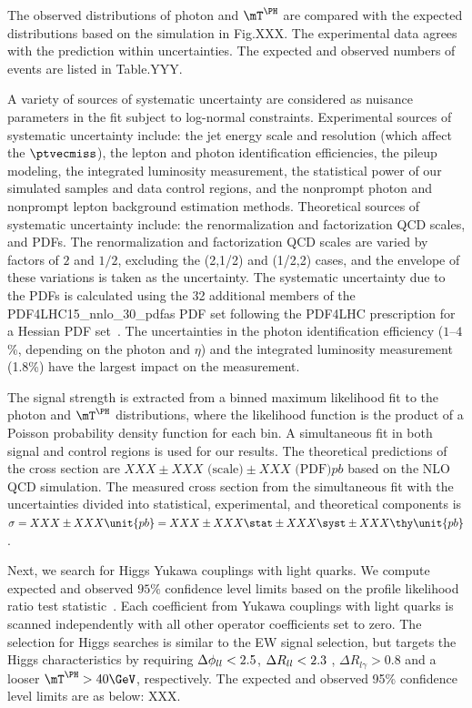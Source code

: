 The observed distributions of photon \pt and $\mTH$ are compared with the expected distributions based on the \MGvATNLO simulation in Fig.XXX. The experimental data agrees with the prediction within uncertainties. The expected and observed numbers of events are listed in Table.YYY.

A variety of sources of systematic uncertainty are considered as nuisance parameters in the fit subject to log-normal constraints. Experimental sources of systematic uncertainty include: the jet energy scale and resolution (which affect the $\ptvecmiss$), the lepton and photon identification efficiencies, the pileup modeling, the integrated luminosity measurement, the statistical power of our simulated samples and data control regions, and the nonprompt photon and nonprompt lepton background estimation methods. Theoretical sources of systematic uncertainty include: the renormalization and factorization QCD scales, and PDFs. The renormalization and factorization QCD scales are varied by factors of $2$ and $1/2$, excluding the (2,1/2) and (1/2,2) cases, and the envelope of these variations is taken as the uncertainty. The systematic uncertainty due to the PDFs is calculated using the 32 additional members of the PDF4LHC15\_nnlo\_30\_pdfas PDF set following the PDF4LHC prescription for a Hessian PDF set~\cite{Butterworth_2016,Harland_Lang_2015,Ball_2015,PhysRevD.93.033006}. The uncertainties in the photon identification efficiency ($1$--$4$\%, depending on the photon \pt and $\eta$) and the integrated luminosity measurement (1.8\%) have the largest impact on the measurement.

The signal strength is extracted from a binned maximum likelihood fit to the photon \pt and $\mTH$ distributions, where the likelihood function is the product of a Poisson probability density function for each bin. A simultaneous fit in both signal and control regions is used for our results. The theoretical predictions of the cross section are $XXX \pm XXX \text{ (scale)} \pm XXX \text{ (PDF)} \unit{pb}$ based on the NLO QCD \MGvATNLO simulation. The measured cross section from the simultaneous fit with the uncertainties divided into statistical, experimental, and theoretical components is $\sigma = XXX \pm XXX \unit{pb} =XXX \pm XXX \stat \pm XXX \syst \pm XXX \thy \unit{pb}$. 

Next, we search for Higgs Yukawa couplings with light quarks. We compute expected and observed $95\%$ confidence level limits based on the profile likelihood ratio test statistic~\cite{CMS-NOTE-2011-005}. Each coefficient from  Yukawa couplings with light quarks is scanned independently with all other operator coefficients set to zero. The selection for Higgs searches is similar to the EW signal selection, but targets the Higgs characteristics by requiring $\Delta\phi_{ll}<2.5$, $\Delta R_{ll}<2.3$ , $\Delta R_{l\gamma} >0.8$ and a looser $\mTH > 40\GeV$, respectively. The expected and observed 95\% confidence level limits are as below: XXX.

